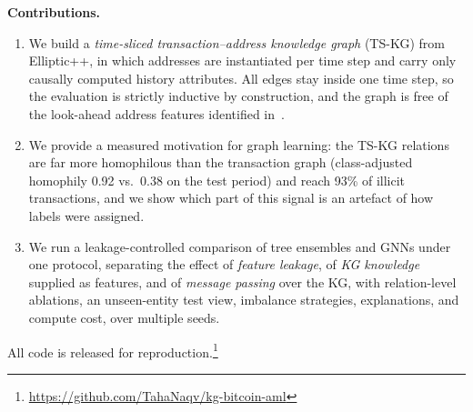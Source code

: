 \textbf{Contributions.}
\begin{enumerate}
\item We build a \emph{time-sliced transaction--address knowledge graph}
(TS-KG) from Elliptic++, in which addresses are instantiated per time step and
carry only causally computed history attributes. All edges stay inside one
time step, so the evaluation is strictly inductive by construction, and the
graph is free of the look-ahead address features identified in~\cite{safar2026}.
\item We provide a measured motivation for graph learning: the TS-KG
relations are far more homophilous than the transaction graph (class-adjusted
homophily 0.92 vs.\ 0.38 on the test period) and reach 93\% of illicit
transactions, and we show which part of this signal is an artefact of how
labels were assigned.
\item We run a leakage-controlled comparison of tree ensembles and GNNs under
one protocol, separating the effect of \emph{feature leakage}, of \emph{KG
knowledge} supplied as features, and of \emph{message passing} over the KG,
with relation-level ablations, an unseen-entity test view, imbalance
strategies, explanations, and compute cost, over multiple seeds.
\end{enumerate}
All code is released for reproduction.\footnote{\url{https://github.com/TahaNaqv/kg-bitcoin-aml}}
